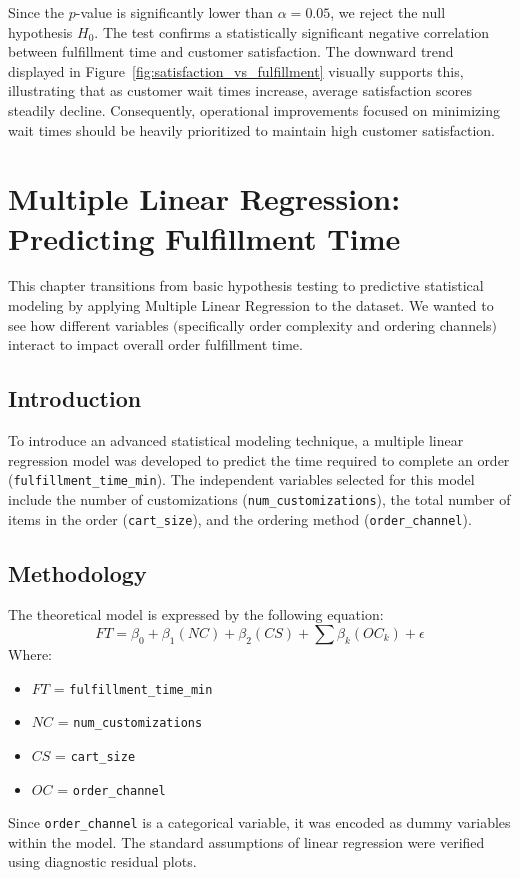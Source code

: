 \documentclass[12pt]{report}
\begin{document}
Since the \(p\)-value is significantly lower than \(\alpha = 0.05\), we reject the null hypothesis \(H_0\). The test confirms a statistically significant negative correlation between fulfillment time and customer satisfaction. The downward trend displayed in Figure~\ref{fig:satisfaction_vs_fulfillment} visually supports this, illustrating that as customer wait times increase, average satisfaction scores steadily decline. Consequently, operational improvements focused on minimizing wait times should be heavily prioritized to maintain high customer satisfaction.


\chapter{Multiple Linear Regression: Predicting Fulfillment Time}
This chapter transitions from basic hypothesis testing to predictive statistical modeling by applying Multiple Linear Regression to the dataset.
We wanted to see how different variables \((\)specifically order complexity and ordering channels\()\) interact to impact overall order fulfillment time.
\section{Introduction}
To introduce an advanced statistical modeling technique, a multiple linear regression model was developed to predict the time required to complete an order (\texttt{fulfillment\_time\_min}). The independent variables selected for this model include the number of customizations (\texttt{num\_customizations}), the total number of items in the order (\texttt{cart\_size}), and the ordering method (\texttt{order\_channel}).

\section{Methodology}
The theoretical model is expressed by the following equation:
\[ FT = \beta_0 + \beta_1(NC) + \beta_2(CS) + \sum \beta_k(OC_k) + \epsilon \]
Where:
\begin{itemize}
    \item \(FT\) = \texttt{fulfillment\_time\_min}
    \item \(NC\) = \texttt{num\_customizations}
    \item \(CS\) = \texttt{cart\_size}
    \item \(OC\) = \texttt{order\_channel}
\end{itemize}
Since \texttt{order\_channel} is a categorical variable, it was encoded as dummy variables within the model. The standard assumptions of linear regression were verified using diagnostic residual plots.
\end{document}
